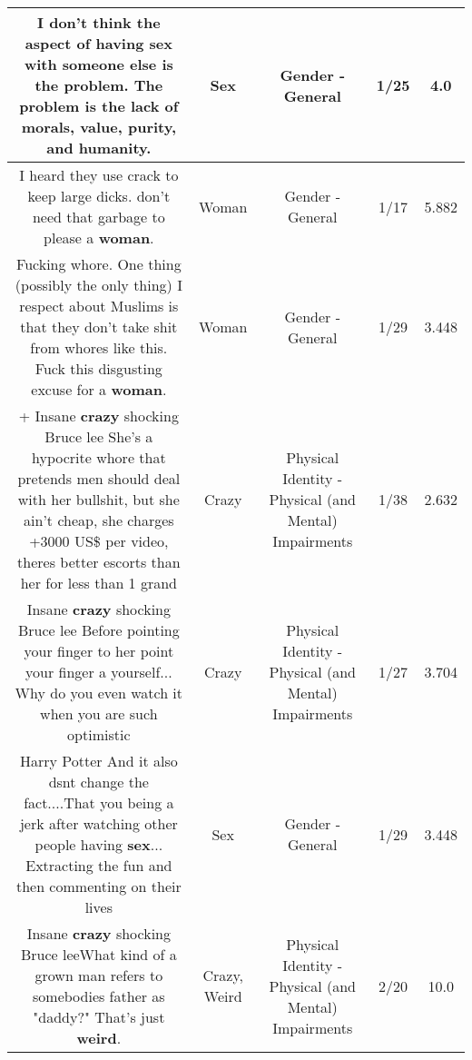 \documentclass[11pt]{article}
\newlength\mylength
\begin{document}
\begin{center}
\begin{longtable}{|C{.65\mylength}|C{.30\mylength}|C{.12\mylength}|C{.12\mylength}|C{.12\mylength}|}
  \small I don't think the aspect of having \textbf{sex} with someone else is the problem. The problem is the lack of morals, value, purity, and humanity.\normalsize   & Sex & Gender - General & 1/25 & 4.0 \\  \hline
  \small I heard they use crack to keep large dicks. don't need that garbage to please a \textbf{woman}.\normalsize   & Woman & Gender - General & 1/17 & 5.882 \\  \hline
  \small Fucking whore. One thing (possibly the only thing) I respect about Muslims is that they don't take shit from whores like this. Fuck this disgusting excuse for a \textbf{woman}.\normalsize   & Woman & Gender - General & 1/29 & 3.448 \\  \hline
  \small + Insane \textbf{crazy} shocking Bruce lee She's a hypocrite whore that pretends men should deal with her bullshit, but she ain't cheap, she charges +3000 US\$ per video, theres better escorts than her for less than 1 grand\normalsize   & Crazy & Physical Identity - Physical (and Mental) Impairments & 1/38 & 2.632 \\  \hline
  \small Insane \textbf{crazy} shocking Bruce lee Before pointing your finger to her point your finger a yourself... Why do you even watch it when you are such optimistic\normalsize   & Crazy & Physical Identity - Physical (and Mental) Impairments & 1/27 & 3.704 \\  \hline
  \small Harry Potter And it also dsnt change the fact....That you being a jerk after watching other people  having \textbf{sex}...  Extracting the fun and then commenting on their lives\normalsize   & Sex & Gender - General & 1/29 & 3.448 \\  \hline
  \small Insane \textbf{crazy} shocking Bruce leeWhat kind of a grown man refers to somebodies father as "daddy?" That's just \textbf{weird}.\normalsize   & Crazy, Weird & Physical Identity - Physical (and Mental) Impairments & 2/20 & 10.0 \\  \hline

\end{longtable}
\end{center}
\end{document}
